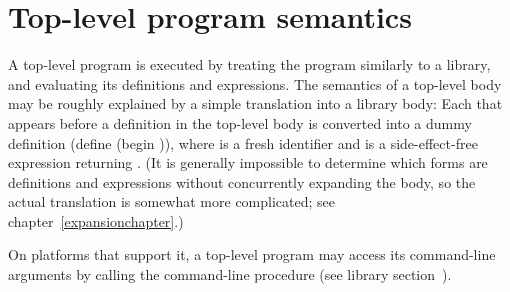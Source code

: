 \section{Top-level program semantics}

A top-level program is executed by treating the program similarly to a library, and
evaluating its definitions and expressions.
The semantics of a top-level body may be roughly explained by
a simple translation into a library body: 
Each  that appears before a
definition in
the top-level body is converted into a dummy definition 
{\cf (define  (begin  ))},
where  is a fresh identifier and 
is a side-effect-free expression returning \unspecifiedreturn.
(It is generally impossible to determine which forms are 
definitions and expressions without concurrently expanding the body, so
the actual translation is somewhat more complicated; see
chapter~\ref{expansionchapter}.)

On platforms that support it, a top-level program may access its command-line 
arguments by calling the {\cf command-line} procedure (see library 
section~).


